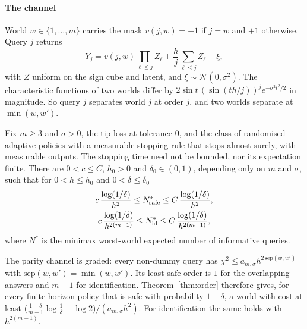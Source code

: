 \paragraph{The channel} World $w\in\{1,\dots,m\}$ carries the mask $v(j,w)=-1$ if $j=w$ and $+1$
otherwise. Query $j$ returns
\[
Y_{j}=v(j,w)\prod_{\ell\le j}Z_{\ell}+\frac hj\sum_{\ell\le j}Z_{\ell}+\xi,
\]
with $Z$ uniform on the sign cube and latent, and $\xi\sim\mathcal N(0,\sigma^{2})$. The
characteristic functions of two worlds differ by $2\sin t\,(\sin(th/j))^{j}e^{-\sigma^{2}t^{2}/2}$
in magnitude. So query $j$ separates world $j$ at order $j$, and two worlds separate at
$\min(w,w')$.


\begin{theorem}
\label{thm:endpoint}
Fix $m\ge3$ and $\sigma>0$, the tip loss at tolerance $0$, and the class of randomised adaptive
policies with a measurable stopping rule that stops almost surely, with measurable outputs. The
stopping time need not be bounded, nor its expectation finite. There are $0<c\le C$, $h_{0}>0$
and $\delta_{0}\in(0,1)$, depending only on $m$ and $\sigma$, such that for $0<h\le h_{0}$ and
$0<\delta\le\delta_{0}$
\begin{gather*}
c\,\frac{\log(1/\delta)}{h^{2}}\le N^{*}_{\rm safe}\le C\,\frac{\log(1/\delta)}{h^{2}},\\
c\,\frac{\log(1/\delta)}{h^{2(m-1)}}\le N^{*}_{\rm id}\le C\,\frac{\log(1/\delta)}{h^{2(m-1)}},
\end{gather*}
where $N^{*}$ is the minimax worst-world expected number of informative queries.
\end{theorem}


\begin{theorem}
\label{thm:parlaw}
The parity channel is graded: every non-dummy query has
$\chi^{2}\le a_{m,\sigma}h^{2\,\mathrm{sep}(w,w')}$ with $\mathrm{sep}(w,w')=\min(w,w')$. Its least
safe order is $1$ for the overlapping answers and $m-1$ for identification. Theorem~\ref{thm:order}
therefore gives, for every finite-horizon policy that is safe with probability $1-\delta$, a
world with cost at least
$\bigl(\frac{1-\delta}{m-1}\log\frac1\delta-\log2\bigr)/(a_{m,\sigma}h^{2})$. For identification
the same holds with $h^{2(m-1)}$.
\end{theorem}

